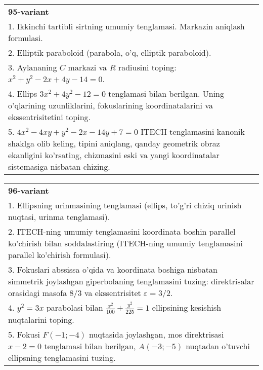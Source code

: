 \documentclass{article}
\begin{document}
\begin{tabular}{m{17cm}}
\textbf{95-variant}\\
1. Ikkinchi tartibli sirtning umumiy tenglamasi. Markazin aniqlash formulasi.\\

2. Elliptik paraboloid (parabola, o'q, elliptik paraboloid).\\

3. Aylananing $C$ markazi va $R$ radiusini toping: $x^2+y^2-2x+4y-14=0$.\\

4. Ellips $3x^{2} + 4y^{2} - 12 = 0$ tenglamasi bilan berilgan. Uning o'qlarining uzunliklarini, fokuslarining koordinatalarini va ekssentrisitetini toping.  \\

5. $4x^{2} - 4xy + y^{2} - 2x - 14y + 7 = 0$ ITECH tenglamasini kanonik shaklga olib keling, tipini aniqlang, qanday geometrik obraz ekanligini ko'rsating, chizmasini eski va yangi koordinatalar sistemasiga nisbatan chizing.  
\end{tabular}
\vspace{1cm}


\begin{tabular}{m{17cm}}
\textbf{96-variant}\\
1. Ellipsning urinmasining tenglamasi (ellips, to'g'ri chiziq urinish nuqtasi, urinma tenglamasi).\\

2. ITECH-ning umumiy tenglamasini koordinata boshin parallel ko'chirish bilan soddalastiring (ITECH-ning umumiy tenglamasini parallel ko'chirish formulasi).\\

3. Fokuslari abssissa o'qida va koordinata boshiga nisbatan simmetrik joylashgan giperbolaning tenglamasini tuzing: direktrisalar orasidagi masofa $8/3$ va ekssentrisitet $\varepsilon=3/2$.\\

4. $y^{2} = 3x$ parabolasi bilan $\frac{x^{2}}{100} + \frac{y^{2}}{225} = 1$ ellipsining kesishish nuqtalarini toping.  \\

5. Fokusi $F( - 1; - 4)$ nuqtasida joylashgan, mos direktrisasi $x - 2 = 0$ tenglamasi bilan berilgan, $A( - 3; - 5)$ nuqtadan o'tuvchi ellipsning tenglamasini tuzing.  
\end{tabular}
\vspace{1cm}
\end{document}
